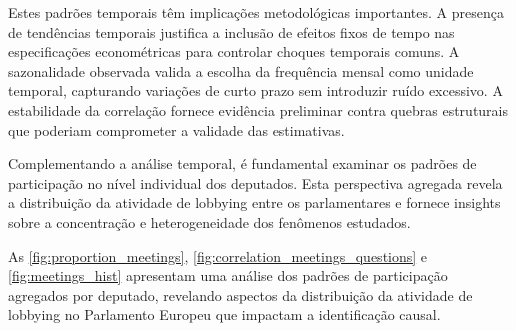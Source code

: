 Estes padrões temporais têm implicações metodológicas importantes. A presença de tendências temporais justifica a inclusão de efeitos fixos de tempo nas especificações econométricas para controlar choques temporais comuns. A sazonalidade observada valida a escolha da frequência mensal como unidade temporal, capturando variações de curto prazo sem introduzir ruído excessivo. A estabilidade da correlação fornece evidência preliminar contra quebras estruturais que poderiam comprometer a validade das estimativas.


Complementando a análise temporal, é fundamental examinar os padrões de participação no nível individual dos deputados. Esta perspectiva agregada revela a distribuição da atividade de lobbying entre os parlamentares e fornece insights sobre a concentração e heterogeneidade dos fenômenos estudados.



As \autoref{fig:proportion_meetings}, \autoref{fig:correlation_meetings_questions} e \autoref{fig:meetings_hist} apresentam uma análise dos padrões de participação agregados por deputado, revelando aspectos da distribuição da atividade de lobbying no Parlamento Europeu que impactam a identificação causal.





